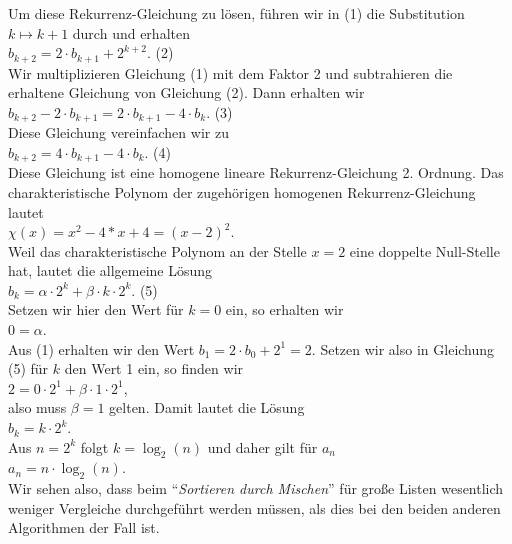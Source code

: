 Um diese Rekurrenz-Gleichung zu l\"osen, f\"uhren wir in (1) die Substitution $k \mapsto k+1$ durch und erhalten \\[0.2cm]
\hspace*{1.3cm}  $b_{k+2} = 2 \cdot b_{k+1} + 2^{k+2}$. \hspace*{\fill} (2) \\[0.2cm]
Wir multiplizieren Gleichung (1) mit dem Faktor 2 und subtrahieren die erhaltene Gleichung von Gleichung (2). 
Dann erhalten wir \\[0.2cm]
\hspace*{1.3cm}  $b_{k+2} - 2 \cdot b_{k+1} = 2 \cdot b_{k+1} - 4 \cdot b_k$. \hspace*{\fill} (3) \\[0.2cm]
Diese Gleichung vereinfachen wir zu \\[0.2cm]
\hspace*{1.3cm}  $b_{k+2} = 4 \cdot b_{k+1} - 4 \cdot b_k$. \hspace*{\fill} (4) \\[0.2cm]
Diese Gleichung ist eine homogene lineare Rekurrenz-Gleichung 2. Ordnung.
Das charakteristische Polynom der zugeh\"origen homogenen Rekurrenz-Gleichung lautet \\[0.2cm]
\hspace*{1.3cm} $\displaystyle \chi(x) = x^2 - 4 *x + 4 = (x-2)^2$. \\[0.2cm]
Weil das charakteristische Polynom an der Stelle $x=2$ eine doppelte Null-Stelle hat, 
lautet die allgemeine L\"osung \\[0.2cm]
\hspace*{1.3cm} $\displaystyle b_k = \alpha \cdot 2^k + \beta \cdot k \cdot 2^k$. \hspace*{\fill} (5) \\[0.2cm]
Setzen wir hier den Wert f\"ur $k=0$ ein, so erhalten wir \\[0.2cm]
\hspace*{1.3cm} $0 = \alpha$. \\[0.2cm]
Aus (1) erhalten wir den Wert $b_1 = 2 \cdot b_0 + 2^1 = 2$.  Setzen wir also in Gleichung (5) f\"ur $k$ den Wert 1 ein, 
so finden wir \\[0.2cm]
\hspace*{1.3cm} $2 = 0 \cdot 2^1 + \beta \cdot 1 \cdot 2^1$,  \\[0.2cm]
also muss $\beta = 1$ gelten.  Damit lautet die L\"osung \\[0.2cm]
\hspace*{1.3cm} $b_k = k \cdot 2^k$. \\[0.2cm]
Aus $n = 2^k$ folgt $k = \log_2(n)$ und daher gilt f\"ur $a_n$ \\[0.2cm]
\hspace*{1.3cm} $a_n = n \cdot \log_2(n)$. \\[0.2cm]
Wir sehen also, dass beim ``\emph{Sortieren durch Mischen}'' f\"ur gro{\ss}e Listen wesentlich weniger Vergleiche
durchgef\"uhrt werden m\"ussen, als dies bei den beiden anderen Algorithmen der Fall ist.

